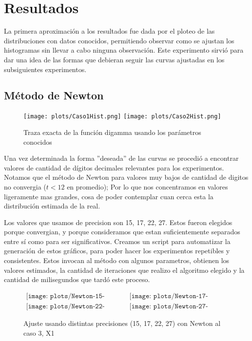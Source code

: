 \section{Resultados}


La primera aproximaci\'on a los resultados fue dada por el ploteo de las distribuciones con datos conocidos, permitiendo observar como se ajustan los histogramas sin llevar a cabo ninguna observaci\'on. Este experimento sirvi\'o para dar una idea de las formas que debieran seguir las curvas ajustadas en los subsiguientes experimentos.

\subsection{M\'etodo de Newton}

\begin{figure} [H]
\begin {center}
\texttt{[image: plots/Caso1Hist.png]}
\texttt{[image: plots/Caso2Hist.png]}
\end {center}
\caption{Traza exacta de la funci\'on digamma usando los par\'ametros conocidos}
\label{fig:FitCaso3Newton}
\end{figure}

Una vez determinada la forma ''deseada'' de las curvas se procedi\'o a encontrar valores de cantidad de d\'igitos decimales relevantes para los experimentos. Notamos que el m\'etodo de Newton para valores muy bajos de cantidad de digitos no convergia ($t < 12$ en promedio); Por lo que nos concentramos en valores
ligeramente mas grandes, cosa de poder contemplar cuan cerca esta la distribuci\'on estimada de la real.

Los valores que usamos de precision son 15, 17, 22, 27. Estos fueron elegidos porque convergian, y porque consideramos que estan
suficientemente separados entre s\'i como para ser significativos. Creamos un script para automatizar la generaci\'on de estos gr\'aficos,
para poder hacer los experimentos repetibles y consistentes. Estos invocan al m\'etodo con algunos parametros, obtienen los
valores estimados, la cantidad de iteraciones que realizo el algoritmo elegido y la cantidad de milisegundos que tard\'o este proceso.


\begin{figure} [H]
$\begin{array}{cc}
\texttt{[image: plots/Newton-15-caso3.png]} &
\texttt{[image: plots/Newton-17-caso3.png]} \\
\texttt{[image: plots/Newton-22-caso3.png]} &
\texttt{[image: plots/Newton-27-caso3.png]}
\end{array}$
\caption{Ajuste usando distintas precisiones (15, 17, 22, 27) con Newton al caso 3, X1}
\label{fig:FitCaso3Newton}
\end{figure}

